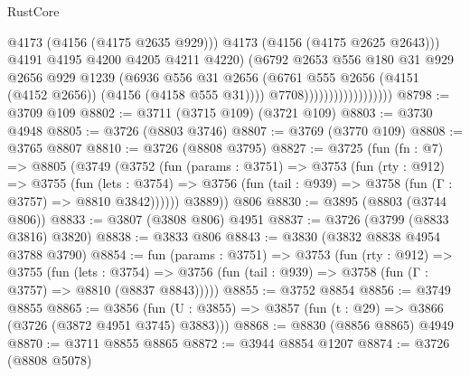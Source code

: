 \begin{lexlean}{RustCore}
\begin{coremodule}
                                            @4173
                                            (@4156 (@4175 @2635 @929)))
                                          @4173
                                          (@4156 (@4175 @2625 @2643)))
                                        @4191
                                        @4195
                                        @4200
                                        @4205
                                        @4211
                                        @4220)
                                      (@6792
                                        @2653
                                        @556
                                        @180
                                        @31
                                        @929
                                        @2656
                                        @929
                                        @1239
                                        (@6936
                                          @556
                                          @31
                                          @2656
                                          (@6761
                                            @555
                                            @2656
                                            (@4151 (@4152 @2656))
                                            (@4156 (@4158 @555 @31))))
                                        @7708))))))))))))))))))
@8798 := @3709 @109
@8802 := @3711 (@3715 @109) (@3721 @109)
@8803 := @3730 @4948
@8805 := @3726 (@8803 @3746)
@8807 := @3769 (@3770 @109)
@8808 := @3765 @8807
@8810 := @3726 (@8808 @3795)
@8827 := @3725
    (fun (fn : @7) =>
    @8805
      (@3749
        (@3752
          (fun (params : @3751) =>
          @3753
            (fun (rty : @912) =>
            @3755
              (fun (lets : @3754) =>
              @3756 (fun (tail : @939) => @3758 (fun (Γ : @3757) => @8810 @3842))))))
        @3889))
    @806
@8830 := @3895 (@8803 (@3744 @806))
@8833 := @3807 (@3808 @806) @4951
@8837 := @3726 (@3799 (@8833 @3816) @3820)
@8838 := @3833 @806
@8843 := @3830 (@3832 @8838 @4954 @3788 @3790)
@8854 := fun (params : @3751) =>
  @3753
    (fun (rty : @912) =>
    @3755
      (fun (lets : @3754) =>
      @3756 (fun (tail : @939) => @3758 (fun (Γ : @3757) => @8810 (@8837 @8843)))))
@8855 := @3752 @8854
@8856 := @3749 @8855
@8865 := @3856 (fun (U : @3855) => @3857 (fun (t : @29) => @3866 (@3726 (@3872 @4951 @3745) @3883)))
@8868 := @8830 (@8856 @8865) @4949
@8870 := @3711 @8855 @8865
@8872 := @3944 @8854 @1207
@8874 := @3726 (@8808 @5078)

\end{coremodule}
\end{lexlean}
